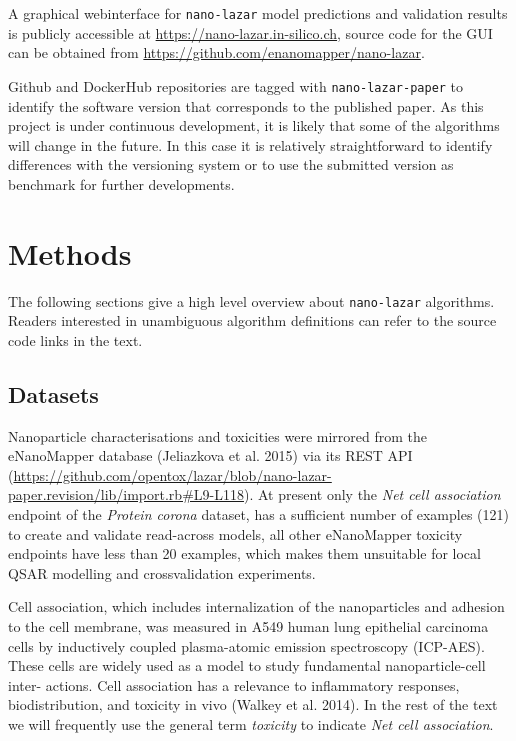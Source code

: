 \documentclass[utf8]{frontiersHLTH} %
\begin{document}
A graphical webinterface for \texttt{nano-lazar} model predictions and
validation results is publicly accessible at
\url{https://nano-lazar.in-silico.ch}, source code for the GUI can be
obtained from \url{https://github.com/enanomapper/nano-lazar}.

Github and DockerHub repositories are tagged with
\texttt{nano-lazar-paper} to identify the software version that
corresponds to the published paper. As this project is under continuous
development, it is likely that some of the algorithms will change in the
future. In this case it is relatively straightforward to identify
differences with the versioning system or to use the submitted version
as benchmark for further developments.

\section{Methods}\label{methods}

The following sections give a high level overview about
\texttt{nano-lazar} algorithms. Readers interested in unambiguous
algorithm definitions can refer to the source code links in the text.

\subsection{Datasets}\label{datasets}

Nanoparticle characterisations and toxicities were mirrored from the
eNanoMapper database (Jeliazkova et al. 2015) via its REST API
(\url{https://github.com/opentox/lazar/blob/nano-lazar-paper.revision/lib/import.rb\#L9-L118}).
At present only the \emph{Net cell association} endpoint of the
\emph{Protein corona} dataset, has a sufficient number of examples (121)
to create and validate read-across models, all other eNanoMapper
toxicity endpoints have less than 20 examples, which makes them
unsuitable for local QSAR modelling and crossvalidation experiments.

Cell association, which includes internalization of the nanoparticles
and adhesion to the cell membrane, was measured in A549 human lung
epithelial carcinoma cells by inductively coupled plasma-atomic emission
spectroscopy (ICP-AES). These cells are widely used as a model to study
fundamental nanoparticle-cell inter- actions. Cell association has a
relevance to inflammatory responses, biodistribution, and toxicity in
vivo (Walkey et al. 2014). In the rest of the text we will frequently
use the general term \emph{toxicity} to indicate \emph{Net cell
association}.
\end{document}
